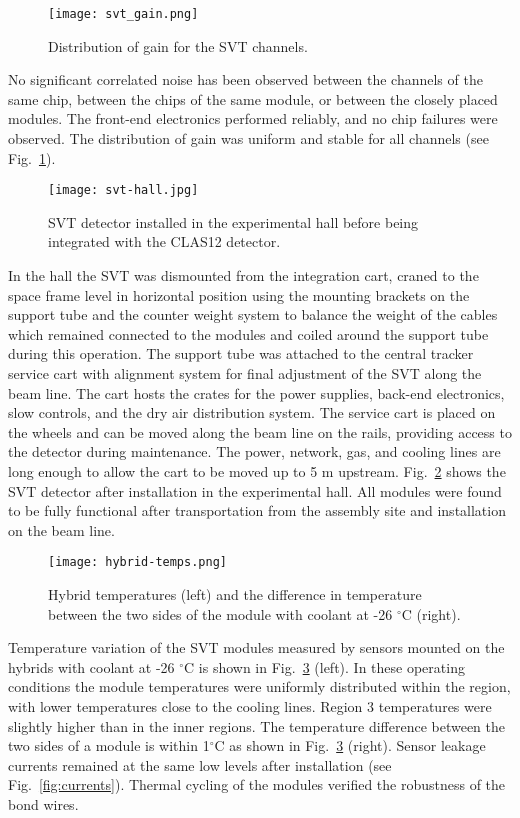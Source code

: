 \begin{figure}[hbt] 
\centering 
\texttt{[image: svt\_gain.png]}
\caption{Distribution of gain for the SVT channels.}
\label{fig:svt_gain}
\end{figure}

No significant correlated noise has been observed between the channels of the same chip, between the chips of the same module, or between the closely placed modules. The front-end electronics performed reliably, and no chip failures were observed. The distribution of gain was uniform and stable for all channels (see Fig.~\ref{fig:svt_gain}). 
 
\begin{figure}[hbt] 
\centering 
\texttt{[image: svt-hall.jpg]}
\caption{SVT detector installed in the experimental hall before being integrated with the CLAS12 detector.}
\label{fig:svt-hall}
\end{figure}

In the hall the SVT was dismounted from the integration cart, craned to the space frame level in horizontal position using the mounting brackets on the support tube and the counter weight system to balance the weight of the cables which remained connected to the modules and coiled around the support tube during this operation. The support tube was attached to the central tracker service cart with alignment system for final adjustment of the SVT along the beam line. The cart hosts the crates for the power supplies, back-end electronics, slow controls, and the dry air distribution system. The service cart is placed on the wheels and can be moved along the beam line on the rails, providing access to the detector during maintenance. The power, network, gas, and cooling lines are long enough to allow the cart to be moved up to 5 m upstream. Fig.~\ref{fig:svt-hall} shows the SVT detector after installation in the experimental hall. All modules were found to be fully functional after transportation from the assembly site and installation on the beam line. 

\begin{figure}[hbt] 
\centering 
\texttt{[image: hybrid-temps.png]}
\caption{Hybrid temperatures (left) and the difference in temperature between the two sides of the module with coolant at -26 $^\circ$C (right).}
\label{fig:hybrid-temps}
\end{figure}

Temperature variation of the SVT modules measured by sensors mounted on the hybrids with coolant at -26 $^\circ$C is shown in Fig.~\ref{fig:hybrid-temps} (left). In these operating conditions the module temperatures were uniformly distributed within the region, with lower temperatures close to the cooling lines. Region 3 temperatures were slightly higher than in the inner regions. The temperature difference between the two sides of a module is within 1$^\circ$C as shown in Fig.~\ref{fig:hybrid-temps} (right). Sensor leakage currents remained at the same low levels after installation (see Fig.~\ref{fig:currents}). Thermal cycling of the modules verified the robustness of the bond wires.


